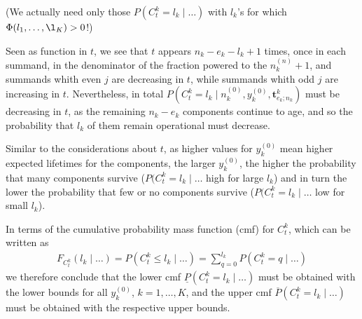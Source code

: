 \documentclass[12pt,a4paper,fleqn]{narms}
\newcommand{\mbf}[1]{\mathbf{#1}}
\newcommand{\uz}{^{(0)}} %
\newcommand{\un}{^{(n)}} %
\newcommand{\ul}[1]{\underline{#1}}
\newcommand{\ol}[1]{\overline{#1}}
\def\ykz{y\uz_k}
\def\nkz{n\uz_k}
\def\nkn{n\un_k}
\def\PkZ{\Pi\uz_k}
\begin{document}
(We actually need only those $P(C^k_t = l_k\mid \ldots)$ with $l_k$'s for which $\Phi(l_1,\ldots,\l_K) > 0$!)


Seen as function in $t$, we see that $t$ appears $n_k-e_k-l_k+1$ times,
once in each summand, in the denominator of the fraction powered to the $\nkn+1$,
and summands whith even $j$ are decreasing in $t$,
while summands whith odd $j$ are increasing in $t$.
Nevertheless, in total $P(C^k_t = l_k\mid\nkz,\ykz, \mbf{t}^k_{e_k;n_k})$
must be decreasing in $t$, as the remaining $n_k-e_k$ components continue to age,
and so the probability that $l_k$ of them remain operational must decrease.


Similar to the considerations about $t$, as higher values for $\ykz$ mean higher expected lifetimes for the components,
the larger $\ykz$, the higher the probability that many components survive
($P(C^k_t = l_k\mid\ldots$ high for large $l_k$)
and in turn the lower the probability that few or no components survive
($P(C^k_t = l_k\mid\ldots$ low for small $l_k$).

In terms of the cumulative probability mass function (cmf) for $C^k_t$, which can be written as 
\begin{align}
F_{C^k_t}(l_k \mid \ldots) = P(C^k_t \leq l_k\mid\ldots) = \sum_{q=0}^{l_k} P(C^k_t = q\mid\ldots)
\end{align}
we therefore conclude that
the lower cmf $\ul{P}(C^k_t = l_k\mid \ldots)$ must be obtained with the lower bounds for all $\ykz$, $k=1,\ldots,K$,
and the upper cmf $\ol{P}(C^k_t = l_k\mid \ldots)$ must be obtained with the respective upper bounds.

\end{document}
